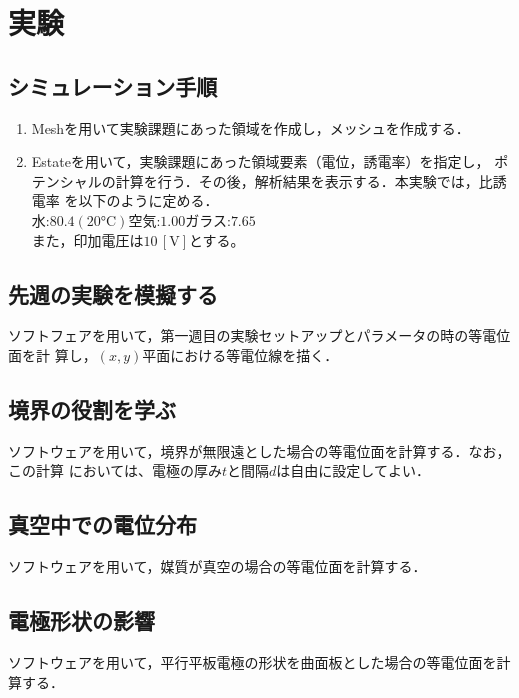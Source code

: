 
\section{実験}

\subsection{シミュレーション手順}
\begin{enumerate}
    \item Meshを用いて実験課題にあった領域を作成し，メッシュを作成する．
    \item Estateを用いて，実験課題にあった領域要素（電位，誘電率）を指定し，
    ポテンシャルの計算を行う．その後，解析結果を表示する．本実験では，比誘電率
    を以下のように定める．\\
    水:$80.4(20\si{\celsius})$\quad 空気:$1.00$\quad ガラス:$7.65$\\
    また，印加電圧は$10\,[\si{\volt}]$とする。
\end{enumerate}

\subsection{先週の実験を模擬する}
ソフトフェアを用いて，第一週目の実験セットアップとパラメータの時の等電位面を計
算し，$(x,y)$平面における等電位線を描く．

\subsection{境界の役割を学ぶ}
ソフトウェアを用いて，境界が無限遠とした場合の等電位面を計算する．なお，この計算
においては、電極の厚み$t$と間隔$d$は自由に設定してよい．

\subsection{真空中での電位分布}
ソフトウェアを用いて，媒質が真空の場合の等電位面を計算する．

\subsection{電極形状の影響}
ソフトウェアを用いて，平行平板電極の形状を曲面板とした場合の等電位面を計算する．
